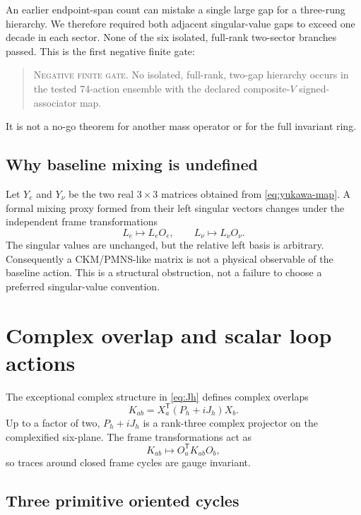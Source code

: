 \documentclass[11pt]{article}
\newcommand{\status}[1]{\textsc{#1}}
\begin{document}
An earlier endpoint-span count can mistake a single large gap for a three-rung hierarchy.  We therefore required both adjacent singular-value gaps to exceed one decade in each sector.  None of the six isolated, full-rank two-sector branches passed.  This is the first negative finite gate:
\begin{quote}
\status{Negative finite gate.} No isolated, full-rank, two-gap hierarchy occurs in the tested 74-action ensemble with the declared composite-$V$ signed-associator map.
\end{quote}
It is not a no-go theorem for another mass operator or for the full invariant ring.

\subsection{Why baseline mixing is undefined}

Let $Y_e$ and $Y_\nu$ be the two real $3\times3$ matrices obtained from \cref{eq:yukawa-map}.  A formal mixing proxy formed from their left singular vectors changes under the independent frame transformations
\begin{equation}
  L_e\mapsto L_e O_e,\qquad L_\nu\mapsto L_\nu O_\nu.
\end{equation}
The singular values are unchanged, but the relative left basis is arbitrary.  Consequently a CKM/PMNS-like matrix is not a physical observable of the baseline action.  This is a structural obstruction, not a failure to choose a preferred singular-value convention.

\section{Complex overlap and scalar loop actions}
\label{sec:loops}

The exceptional complex structure in \cref{eq:Jh} defines complex overlaps
\begin{equation}
  K_{ab}=X_a^{\mathsf T}(P_h+iJ_h)X_b.
  \label{eq:Kab}
\end{equation}
Up to a factor of two, $P_h+iJ_h$ is a rank-three complex projector on the complexified six-plane.  The frame transformations act as
\begin{equation}
  K_{ab}\mapsto O_a^{\mathsf T}K_{ab}O_b,
\end{equation}
so traces around closed frame cycles are gauge invariant.

\subsection{Three primitive oriented cycles}
\end{document}

